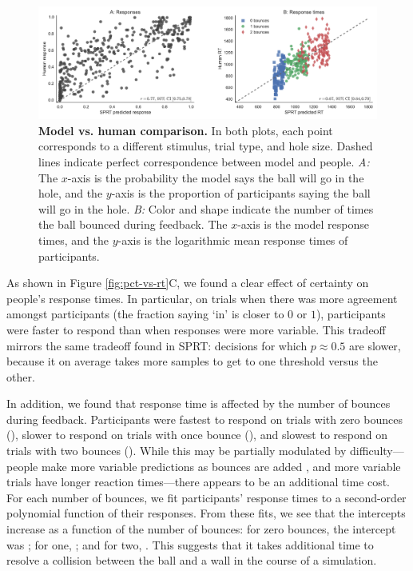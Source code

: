 \documentclass[10pt,letterpaper]{article}
\begin{document}
\begin{figure}[t]
    \begin{center}
        \includegraphics[width=\textwidth]{figures/model_results.pdf}
        \caption{\textbf{Model vs. human comparison.} In both plots, each point corresponds to a different stimulus, trial type, and hole size. Dashed lines indicate perfect correspondence between model and people. \emph{A:} The $x$-axis is the probability the model says the ball will go in the hole, and the $y$-axis is the proportion of participants saying the ball will go in the hole. \emph{B:} Color and shape indicate the number of times the ball bounced during feedback. The $x$-axis is the model response times, and the $y$-axis is the logarithmic mean response times of participants.}
        \label{fig:model-results}
    \end{center}
\end{figure}

As shown in Figure \ref{fig:pct-vs-rt}C, we found a clear effect of certainty on people's response times.
In particular, on trials when there was more agreement amongst participants (the fraction saying `in' is closer to $0$ or $1$), participants were faster to respond than when responses were more variable.
This tradeoff mirrors the same tradeoff found in SPRT: decisions for which $p\approx0.5$ are slower, because it on average takes more samples to get to one threshold versus the other.

In addition, we found that response time is affected by the number of bounces during feedback.
Participants were fastest to respond on trials with zero bounces (\RTZeroBounces{}), slower to respond on trials with once bounce (\RTOneBounces{}), and slowest to respond on trials with two bounces (\RTTwoBounces{}).
While this may be partially modulated by difficulty---people make more variable predictions as bounces are added \cite{Smith:2013fc}, and more variable trials have longer reaction times---there appears to be an additional time cost.
For each number of bounces, we fit participants' response times to a second-order polynomial function of their responses.
From these fits, we see that the intercepts increase as a function of the number of bounces: for zero bounces, the intercept was \InterceptZeroBounces{}; for one, \InterceptOneBounces{}; and for two, \InterceptTwoBounces{}.
This suggests that it takes additional time to resolve a collision between the ball and a wall in the course of a simulation.
\end{document}
